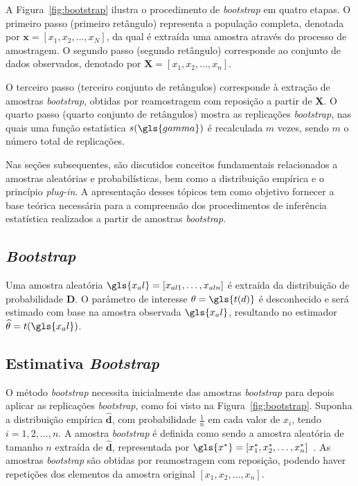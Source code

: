 A Figura~\ref{fig:bootstrap} ilustra o procedimento de \textit{bootstrap} em quatro etapas. O primeiro passo (primeiro retângulo) representa a população completa, denotada por $\mathbf{x} = [x_1, x_2, \dots, x_N]$, da qual é extraída uma amostra através do processo de amostragem. O segundo passo (segundo retângulo) corresponde ao conjunto de dados observados, denotado por $\mathbf{X} = [x_1, x_2, \dots, x_n]$.

O terceiro passo (terceiro conjunto de retângulos) corresponde à extração de amostras \textit{bootstrap}, obtidas por reamostragem com reposição a partir de $\mathbf{X}$. O quarto passo (quarto conjunto de retângulos) mostra as replicações \textit{bootstrap}, nas quais uma função estatística $s(\gls{gamma})$ é recalculada $m$ vezes, sendo $m$ o número total de replicações.

Nas seções subsequentes, são discutidos conceitos fundamentais relacionados a amostras aleatórias e probabilísticas, bem como a distribuição empírica e o princípio \textit{plug-in}. A apresentação desses tópicos tem como objetivo fornecer a base teórica necessária para a compreensão dos procedimentos de inferência estatística realizados a partir de amostras \textit{bootstrap}.

\subsection{\textit{Bootstrap}}
\label{sec:boot}
Uma amostra aleatória $\gls{x_al} = [x_{al1},\ldots, x_{aln}]$ é extraída da distribuição de probabilidade \textbf{D}. O parâmetro de interesse $\theta = \gls{t(d)}$ é desconhecido e será estimado com base na amostra observada $\gls{x_al}$, resultando no estimador $\widehat{\theta} = t(\gls{x_al})$.

\subsection{Estimativa \textit{Bootstrap}}
\label{sec:estboot}
O método \textit{bootstrap} necessita inicialmente das amostras \textit{bootstrap} para depois aplicar as replicações \textit{bootstrap}, como foi visto na Figura~\ref{fig:bootstrap}. Suponha a distribuição empírica $\widehat{\textbf{d}}$, com probabilidade $\frac{1}{n}$ em cada valor de $x_i$, tendo $i = 1, 2,\ldots, n$. A amostra \textit{bootstrap} é definida como sendo a amostra aleatória de tamanho $n$ extraída de $\widehat{\textbf{d}}$, representada por $\gls{x^*} =[x_1^*, x_2^*,\ldots, x_n^*]$~\cite{EFRON:1994}. As amostras \textit{bootstrap} são obtidas por reamostragem com reposição, podendo haver repetições dos elementos da amostra original $[x_1, x_2,\ldots, x_n]$.

